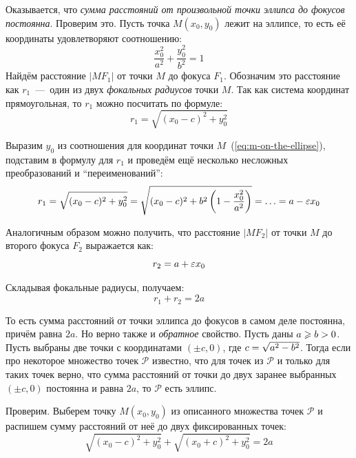 \documentclass[a4paper,12pt]{article}
\begin{document}
  Оказывается, что \emph{сумма расстояний от произвольной точки эллипса до фокусов постоянна}.
  Проверим это.
  Пусть точка $M(x_0, y_0)$ лежит на эллипсе, то есть её координаты удовлетворяют соотношению:
  \begin{equation}\label{eq:m-on-the-ellipse}
    \frac{x_0^2}{a^2} + \frac{y_0^2}{b^2} = 1
  \end{equation}
  Найдём расстояние $|MF_1|$ от точки $M$ до фокуса $F_1$.
  Обозначим это расстояние как $r_1$~---~один из двух \emph{фокальных радиусов} точки $M$.
  Так как система координат прямоугольная, то $r_1$ можно посчитать по формуле:
  \[
    r_1 = \sqrt{(x_0 - c)^2 + y_0^2}
  \]
  
  Выразим $y_0$ из соотношения для координат точки $M$~(\ref{eq:m-on-the-ellipse}), подставим в формулу для $r_1$ и проведём ещё несколько несложных преобразований и ``переименований'':
  \begin{equation}
  \begin{split}
    r_1 = \sqrt{(x_0 - c)^2 + y_0^2}
        = \sqrt{(x_0 - c)^2 + b^2\left(1 - \frac{x_0^2}{a^2}\right)}
        = \ldots
        = a - \varepsilon x_0
  \end{split}
  \end{equation}
  
  Аналогичным образом можно получить, что расстояние $|MF_2|$ от точки $M$ до второго фокуса $F_2$ выражается как:
  \[
    r_2 = a + \varepsilon x_0
  \]
  
  Складывая фокальные радиусы, получаем:
  \begin{equation}\label{eq:ellipse-r1-plus-r2}
    \boxed{
        r_1 + r_2 = 2a
    }
  \end{equation}
  
  То есть сумма расстояний от точки эллипса до фокусов в самом деле постоянна, причём равна $2a$.
  Но верно также и \emph{обратное} свойство.
  Пусть даны $a \hm\geq b \hm> 0$.
  Пусть выбраны две точки с координатами $(\pm c, 0)$, где $c \hm= \sqrt{a^2 \hm- b^2}$.
  Тогда если про некоторое множество точек $\mathcal P$ известно, что для точек из $\mathcal P$ и только для таких точек верно, что сумма расстояний от точки до двух заранее выбранных $(\pm c, 0)$ постоянна и равна $2a$, то $\mathcal P$ есть эллипс.
  
  Проверим.
  Выберем точку $M(x_0, y_0)$ из описанного множества точек $\mathcal P$ и распишем сумму расстояний от неё до двух фиксированных точек:
  \[
    \sqrt{(x_0 - c)^2 + y_0^2} + \sqrt{(x_0 + c)^2 + y_0^2} = 2a
  \]
  
\end{document}
